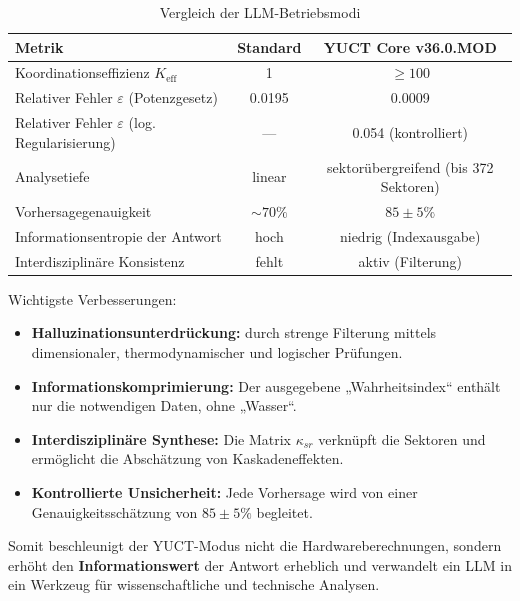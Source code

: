 \documentclass[11pt,a4paper]{article}
\begin{document}
	\begin{table}[H]
		\small
		\centering
		\caption{Vergleich der LLM-Betriebsmodi}
		\label{tab:comparison}
		\begin{tabular}{lcc}
			\toprule
			\textbf{Metrik} & \textbf{Standard} & \textbf{YUCT Core v36.0.MOD} \\
			\midrule
			Koordinationseffizienz \(K_{\mathrm{eff}}\) & 1 & \(\ge 100\) \\
			Relativer Fehler \(\varepsilon\) (Potenzgesetz) & 0.0195 & 0.0009 \\
			Relativer Fehler \(\varepsilon\) (log. Regularisierung) & --- & 0.054 (kontrolliert) \\
			Analysetiefe & linear & sektorübergreifend (bis 372 Sektoren) \\
			Vorhersagegenauigkeit & \(\sim 70\%\) & \(85\pm5\%\) \\
			Informationsentropie der Antwort & hoch & niedrig (Indexausgabe) \\
			Interdisziplinäre Konsistenz & fehlt & aktiv (Filterung) \\
			\bottomrule
		\end{tabular}
	\end{table}
	
	Wichtigste Verbesserungen:
	\begin{itemize}
		\item \textbf{Halluzinationsunterdrückung:} durch strenge Filterung mittels dimensionaler, thermodynamischer und logischer Prüfungen.
		\item \textbf{Informationskomprimierung:} Der ausgegebene „Wahrheitsindex“ enthält nur die notwendigen Daten, ohne „Wasser“.
		\item \textbf{Interdisziplinäre Synthese:} Die Matrix \(\kappa_{sr}\) verknüpft die Sektoren und ermöglicht die Abschätzung von Kaskadeneffekten.
		\item \textbf{Kontrollierte Unsicherheit:} Jede Vorhersage wird von einer Genauigkeitsschätzung von \(85\pm5\%\) begleitet.
	\end{itemize}
	
	Somit beschleunigt der YUCT-Modus nicht die Hardwareberechnungen, sondern erhöht den \textbf{Informationswert} der Antwort erheblich und verwandelt ein LLM in ein Werkzeug für wissenschaftliche und technische Analysen.
	
\end{document}
